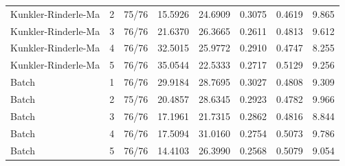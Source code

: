 \begin{table}[p]
{\begin{tabular}{llrrrrrr}
        Kunkler-Rinderle-Ma & 2 & 75/76 & 15.5926 & 24.6909 & 0.3075 & 0.4619 & 9.865 \\
        Kunkler-Rinderle-Ma & 3 & 76/76 & 21.6370 & 26.3665 & 0.2611 & 0.4813 & 9.612 \\
        Kunkler-Rinderle-Ma & 4 & 76/76 & 32.5015 & 25.9772 & 0.2910 & 0.4747 & 8.255 \\
        Kunkler-Rinderle-Ma & 5 & 76/76 & 35.0544 & 22.5333 & 0.2717 & 0.5129 & 9.256 \\
        Batch & 1 & 76/76 & 29.9184 & 28.7695 & 0.3027 & 0.4808 & 9.309 \\
        Batch & 2 & 75/76 & 20.4857 & 28.6345 & 0.2923 & 0.4782 & 9.966 \\
        Batch & 3 & 76/76 & 17.1961 & 21.7315 & 0.2862 & 0.4816 & 8.844 \\
        Batch & 4 & 76/76 & 17.5094 & 31.0160 & 0.2754 & 0.5073 & 9.786 \\
        Batch & 5 & 76/76 & 14.4103 & 26.3990 & 0.2568 & 0.5079 & 9.054 \\
        \bottomrule
    \end{tabular}}
\end{table}
